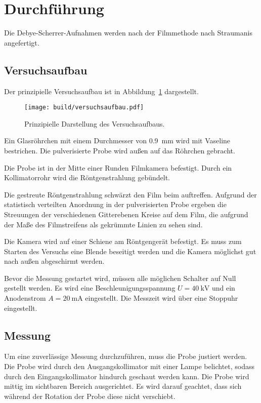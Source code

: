 \section{Durchführung}%
\label{sec:Durchführung}
Die Debye-Scherrer-Aufnahmen werden nach der Filmmethode nach Straumanis angefertigt.

\subsection{Versuchsaufbau}%
\label{sub:versuchsaufbau}
Der prinzipielle Versuchsaufbau ist in Abbildung~\ref{fig:versuchsaufbau} dargestellt.
\begin{figure}
  \centering
  \texttt{[image: build/versuchsaufbau.pdf]}
  \caption{Prinzipielle Darstellung des Versuchsaufbaus.\cite{anleitung}}%
  \label{fig:versuchsaufbau}
\end{figure}

Ein Glasröhrchen mit einem Durchmesser von \SI{0.9}{\milli\meter} wird mit Vaseline bestrichen.
Die pulverisierte Probe wird außen auf das Röhrchen gebracht.

Die Probe ist in der Mitte einer Runden Filmkamera befestigt.
Durch ein Kollimatorrohr wird die Röntgenstrahlung gebündelt.

Die gestreute Röntgenstrahlung schwärzt den Film beim auftreffen.
Aufgrund der statistisch verteilten Anordnung in der pulverisierten Probe
ergeben die Streuungen der verschiedenen Gitterebenen Kreise auf dem Film,
die aufgrund der Maße des Filmstreifens als gekrümmte Linien zu sehen sind.

Die Kamera wird auf einer Schiene am Röntgengerät befestigt.
Es muss zum Starten des Versuchs eine Blende beseitigt werden und die Kamera
möglichst gut nach außen abgeschirmt werden.

Bevor die Messung gestartet wird, müssen alle möglichen Schalter auf Null gestellt werden.
Es wird eine Beschleunigungsspannung $U = \SI{40}{\kilo\volt}$ und ein
Anodenstrom $A = \SI{20}{\milli\ampere}$ eingestellt.
Die Messzeit wird über eine Stoppuhr eingestellt.


\subsection{Messung}%
\label{sub:messung}
Um eine zuverlässige Messung durchzuführen, muss die Probe justiert werden.
Die Probe wird durch den Ausgangskollimator mit einer Lampe belichtet,
sodass durch den Eingangskollimator hindurch geschaut werden kann.
Die Probe wird mittig im sichtbaren Bereich ausgerichtet.
Es wird darauf geachtet, dass sich während der Rotation der Probe diese nicht verschiebt.

